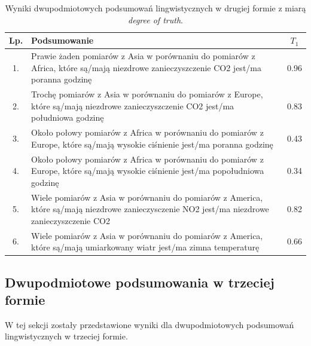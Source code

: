 \documentclass{article}
\begin{document}
\begin{table}[H]
\begin{center}
\normalsize %
\begin{tabular}{|c|p{10cm}|c|} %
\hline
\textbf{Lp.} & \textbf{Podsumowanie} & \textbf{\(T_1\)} \\ \hline
1. & Prawie żaden pomiarów z Asia w porównaniu do pomiarów z Africa, które są/mają niezdrowe zanieczyszczenie CO2 jest/ma poranna godzinę & 0.96 \\\hline  
2. & Trochę pomiarów z Asia w porównaniu do pomiarów z Europe, które są/mają niezdrowe zanieczyszczenie CO2 jest/ma południowa godzinę & 0.83 \\\hline 
3. & Około połowy pomiarów z Africa w porównaniu do pomiarów z Europe, które są/mają wysokie ciśnienie jest/ma poranna godzinę & 0.43 \\\hline
4. & Około połowy pomiarów z Africa w porównaniu do pomiarów z Europe, które są/mają wysokie ciśnienie jest/ma popołudniowa godzinę & 0.34 \\\hline
5. & Wiele pomiarów z Asia w porównaniu do pomiarów z America, które są/mają niezdrowe zanieczysczenie NO2 jest/ma niezdrowe zanieczyszczenie CO2 & 0.82 \\\hline
6. & Wiele pomiarów z Asia w porównaniu do pomiarów z America, które są/mają umiarkowany wiatr jest/ma zimna temperaturę & 0.66 \\\hline 
\end{tabular}
\caption{Wyniki dwupodmiotowych podsumowań lingwistycznych w drugiej formie z miarą \textit{degree of truth}.}
\end{center}
\end{table}

\subsection{Dwupodmiotowe podsumowania w trzeciej formie}
W tej sekcji zostały przedstawione wyniki dla dwupodmiotowych podsumowań lingwistycznych w trzeciej formie.
\end{document}

